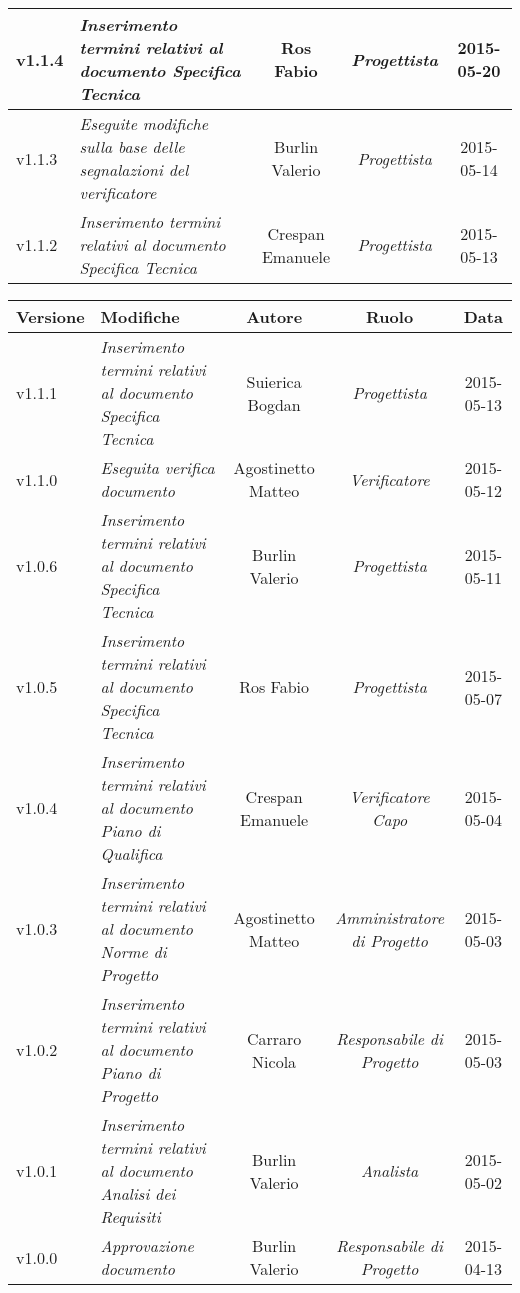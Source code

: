 \begin{table}[h]
\begin{tabular}{|p{}|p{}|c|c|c|}
	\midrule
		v1.1.4 & \textit{Inserimento termini relativi al documento Specifica Tecnica} & Ros Fabio & \textit{Progettista} & 2015-05-20\\
	\midrule
		v1.1.3 & \textit{Eseguite modifiche sulla base delle segnalazioni del verificatore} & Burlin Valerio & \textit{Progettista} & 2015-05-14\\
	\midrule
		v1.1.2 & \textit{Inserimento termini relativi al documento Specifica Tecnica} & Crespan Emanuele & \textit{Progettista} & 2015-05-13\\
	\bottomrule
\end{tabular}	
\end{table}

\newpage

\begin{table}[H]
\centering
\begin{tabular}{|p{}|p{}|c|c|c|}
	\toprule
		\textbf{Versione} & \textbf{Modifiche} & \textbf{Autore} & \textbf{Ruolo} & \textbf{Data} \\
	\midrule
	\midrule
		v1.1.1 & \textit{Inserimento termini relativi al documento Specifica Tecnica} & Suierica Bogdan & \textit{Progettista} & 2015-05-13\\
	\midrule
		v1.1.0 & \textit{Eseguita verifica documento} & Agostinetto Matteo & \textit{Verificatore} & 2015-05-12\\
	\midrule
		v1.0.6 & \textit{Inserimento termini relativi al documento Specifica Tecnica} & Burlin Valerio & \textit{Progettista} & 2015-05-11\\
	\midrule
		v1.0.5 & \textit{Inserimento termini relativi al documento Specifica Tecnica} & Ros Fabio & \textit{Progettista} & 2015-05-07\\
	\midrule
		v1.0.4 & \textit{Inserimento termini relativi al documento Piano di Qualifica} & Crespan Emanuele & \textit{Verificatore Capo} & 2015-05-04\\
	\midrule
		v1.0.3 & \textit{Inserimento termini relativi al documento Norme di Progetto} & Agostinetto Matteo & \textit{Amministratore di Progetto} & 2015-05-03\\
	\midrule
		 v1.0.2 & \textit{Inserimento termini relativi al documento Piano di Progetto} & Carraro Nicola & \textit{Responsabile di Progetto} & 2015-05-03 \\
	\midrule
		  v1.0.1 & \textit{Inserimento termini relativi al documento Analisi dei Requisiti} & Burlin Valerio & \textit{Analista} & 2015-05-02 \\
	\midrule
		v1.0.0 & \textit{Approvazione documento} & Burlin Valerio & \textit{Responsabile di Progetto} & 2015-04-13 \\

\end{tabular}
\end{table}
